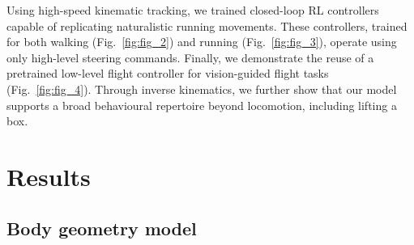\documentclass[sn-mathphys-num]{sn-jnl}%
\theoremstyle{thmstyleone}	%
\theoremstyle{thmstyletwo}	%
\theoremstyle{thmstylethree}	%
\begin{document}
Using high-speed kinematic tracking\cite{branson2009high,pereira2022sleap}, we trained closed-loop RL controllers capable of replicating naturalistic running movements. 
These controllers, trained for both walking (Fig.~\ref{fig:fig_2}) and running (Fig.~\ref{fig:fig_3}), operate using only high-level steering commands. 
Finally, we demonstrate the reuse of a pretrained low-level flight controller for vision-guided flight tasks (Fig.~\ref{fig:fig_4}). 
Through inverse kinematics, we further show that our model supports a broad behavioural repertoire beyond locomotion, including lifting a box.



%

\section{Results}\label{sec3}

		

\subsection{Body geometry model}
\end{document}
